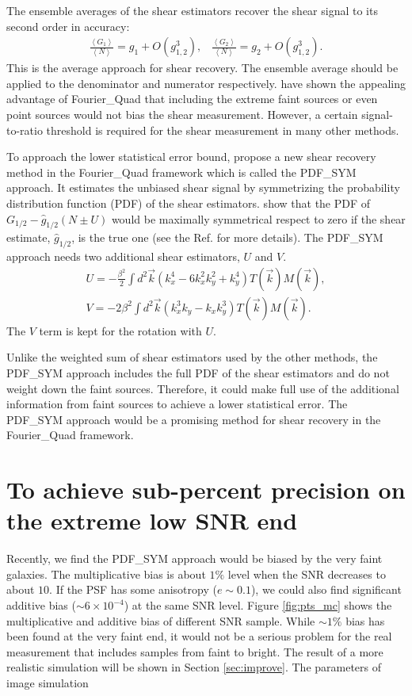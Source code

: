 \documentclass[twocolumn]{aastex62}
\begin{document}
The ensemble averages of the shear estimators recover the shear signal to its second order in accuracy\citep{Zhang2015}:
\begin{eqnarray}
\label{mean}
\frac{\left\langle  G_1\right\rangle }{\left\langle  N\right\rangle }=g_1+O(g_{1,2}^3),\;\;\;\frac{\left\langle  G_2\right\rangle }{\left\langle  N\right\rangle }=g_2+O(g_{1,2}^3).
\end{eqnarray}
This is the average approach for shear recovery. The ensemble average should be applied to the denominator and numerator respectively. \cite{Zhang2015} have shown the appealing advantage of Fourier\_Quad that including the extreme faint sources or even point sources would not bias the shear measurement. However, a certain signal-to-ratio threshold is required for the shear measurement in many other methods.

To approach the lower statistical error bound, \cite{Zhang2017} propose a new shear recovery method in the Fourier\_Quad framework which is called the PDF\_SYM approach. It estimates the unbiased shear signal by symmetrizing the probability distribution function (PDF) of the shear estimators. \cite{Zhang2017} show that the PDF of $G_{1/2} - \hat{g}_{1/2}(N\pm U)$ would be maximally symmetrical respect to zero if the shear estimate, $\hat{g}_{1/2}$, is the true one (see the Ref. for more details). The PDF\_SYM approach needs two additional shear estimators, $U$ and $V$.
\begin{eqnarray}\label{FQ_UV}
U = -\frac{\beta^2}{2}\int d^2\vec{k}(k_x^4 - 6k_x^2k_y^2 + k_y^4)T(\vec{k})M(\vec{k}), \\ \nonumber
V = -2\beta^2\int d^2\vec{k}(k_x^3k_y - k_xk_y^3)T(\vec{k})M(\vec{k}).
\end{eqnarray}
The $V$ term is kept for the rotation with $U$. 

Unlike the weighted sum of shear estimators used by the other methods, the PDF\_SYM approach includes the full PDF of the shear estimators and do not weight down the faint sources. Therefore, it could make full use of the additional information from faint sources to achieve a lower statistical error. The PDF\_SYM approach would be a promising method for shear recovery in the Fourier\_Quad framework.




\section{To achieve sub-percent precision on the extreme low SNR end}
Recently, we find the PDF\_SYM approach would be biased by the very faint galaxies. The multiplicative bias is about $1\%$ level when the SNR decreases to about $10$. If the PSF has some anisotropy ($e \sim 0.1$), we could also find significant additive bias ($\sim 6\times 10^{-4}$) at the same SNR level. Figure \ref{fig:pts_mc} shows the multiplicative and additive bias of different SNR sample. While $\sim 1\%$ bias has been found at the very faint end, it would not be a serious problem for the real measurement that includes samples from faint to bright. The result of a more realistic simulation will be shown in Section \ref{sec:improve}. The parameters of image simulation 
\end{document}
